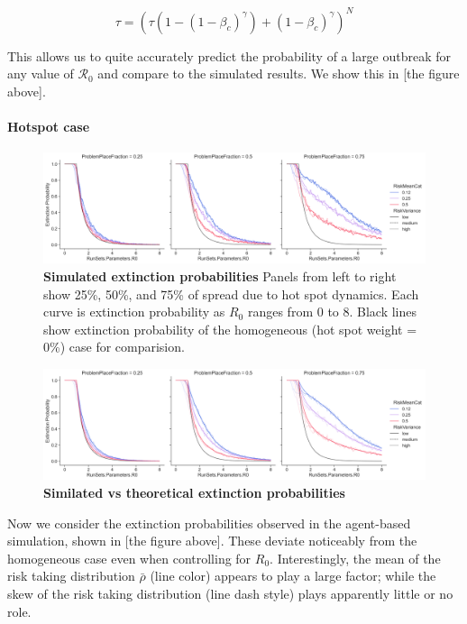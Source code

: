 \[\tau = (\tau (1 - (1 - \beta_c)^\gamma) + (1 - \beta_c)^\gamma)^N\]

This allows us to quite accurately predict the probability of a large
outbreak for any value of \(\mathcal{R}_0\) and compare to the simulated
results. We show this in {[}the figure above{]}.

\paragraph{Hotspot case}\label{hotspot-case}

\begin{figure}
\centering
\includegraphics{images/extinction.png}
\caption{\textbf{Simulated extinction probabilities} Panels from left to
right show 25\%, 50\%, and 75\% of spread due to hot spot dynamics. Each
curve is extinction probability as \(R_0\) ranges from 0 to 8. Black
lines show extinction probability of the homogeneous (hot spot weight =
0\%) case for comparision.}
\end{figure}

\begin{figure}
\centering
\includegraphics{images/extinction_theoretical.png}
\caption{\textbf{Similated vs theoretical extinction probabilities}}
\end{figure}

Now we consider the extinction probabilities observed in the agent-based
simulation, shown in {[}the figure above{]}. These deviate noticeably
from the homogeneous case even when controlling for \(R_0\).
Interestingly, the mean of the risk taking distribution \(\bar\rho\)
(line color) appears to play a large factor; while the skew of the risk
taking distribution (line dash style) plays apparently little or no
role.

